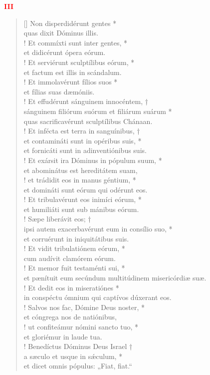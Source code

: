 \begin{center}
\textcolor{red}{\bf III}
\end{center}
\begin{verse}[\versewidth]
Non disperdidérunt gentes *\\
quas dixit Dóminus illis.\\!
\vin Et commíxti sunt inter gentes, *\\
\vin et didicérunt ópera eórum.\\!
Et serviérunt sculptílibus eórum, *\\
et factum est illis in scándalum.\\!
\vin Et immolavérunt fílios suos *\\
\vin et fílias suas dæmóniis.\\!
Et effudérunt sánguinem innocéntem, †\\
sánguinem filiórum suórum et filiárum suárum *\\
quas sacrificavérunt sculptílibus Chánaan.\\!
\vin Et infécta est terra in sanguínibus, †\\
\vin et contamináti sunt in opéribus suis, *\\
\vin et fornicáti sunt in adinventiónibus suis.\\!
Et exársit ira Dóminus in pópulum suum, *\\
et abominátus est hereditátem suam,\\!
\vin et trádidit eos in manus géntium, *\\
\vin et domináti sunt eórum qui odérunt eos.\\!
Et tribulavérunt eos inimíci eórum, *\\
et humiliáti sunt sub mánibus eórum.\\!
\vin Sæpe liberávit eos; †\\
\vin ipsi autem exacerbavérunt eum in consílio suo, *\\
\vin et corruérunt in iniquitátibus suis.\\!
Et vidit tribulatiónem eórum, *\\
cum audívit clamórem eórum.\\!
\vin Et memor fuit testaménti sui, *\\
\vin et pænítuit eum secúndum multitúdinem misericórdiæ suæ.\\!
Et dedit eos in miseratiónes *\\
in conspéctu ómnium qui captívos dúxerant eos.\\!
\vin Salvos nos fac, Dómine Deus noster, *\\
\vin et cóngrega nos de natiónibus,\\!
ut confiteámur nómini sancto tuo, *\\
et gloriémur in laude tua.\\!
\vin Benedíctus Dóminus Deus Israel †\\
\vin a sæculo et usque in s\'{æ}culum, *\\
\vin et dicet omnis pópulus: „Fiat, fiat.“\\
\end{verse}
\vspace{1cm}


